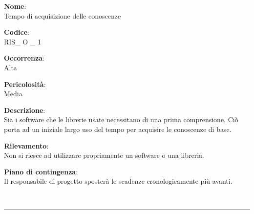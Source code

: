 {\setlength{\parindent}{0cm}
\begin{minipage}{\textwidth} 
\begin{multicols}{4}
\textbf{Nome}: \\ Tempo di acquisizione delle conoscenze
\columnbreak

\textbf{Codice}: \\ RIS\_ O \_ 1 
\columnbreak

\textbf{Occorrenza}: \\ Alta 
\columnbreak

\textbf{Pericolosità}: \\ Media

\end{multicols}

\begin{multicols}{3}

\textbf{Descrizione}: \\ Sia i software che le librerie usate necessitano di una prima comprensione. Ciò porta ad un iniziale largo uso del tempo per acquisire le conoscenze di base.
\columnbreak

\textbf{Rilevamento}: \\ Non si riesce ad utilizzare propriamente un software o una libreria.
\columnbreak

\textbf{Piano di contingenza}: \\ Il responsabile di progetto sposterà le scadenze cronologicamente più avanti. \\

\columnbreak
\end{multicols}
\end{minipage}} \\

\noindent\rule{\textwidth}{1pt}\\

